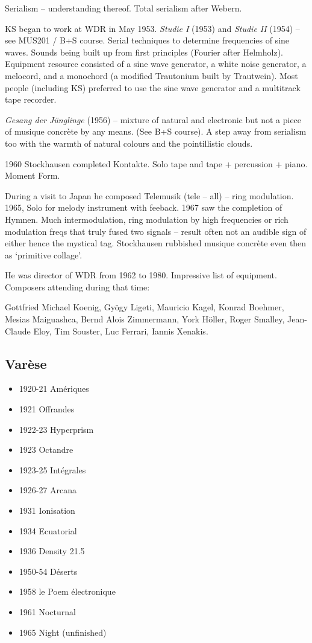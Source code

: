 Serialism – understanding thereof.  Total serialism after Webern. 

KS began to work at WDR in May 1953.  \textit{Studie I} (1953) and \textit{Studie II} (1954) – see MUS201 / B+S course. Serial techniques to determine frequencies of sine waves.  Sounds being built up from first principles (Fourier after Helmholz).  Equipment resource consisted of a sine wave generator, a white noise generator, a melocord, and a monochord (a modified Trautonium built by Trautwein).  Most people (including KS) preferred to use the sine wave generator and a multitrack tape recorder.

\textit{Gesang der J\"unglinge} (1956) – mixture of natural and electronic but not a piece of musique concr\`ete by any means. (See B+S course).  A step away from serialism too with the warmth of natural colours and the pointillistic clouds.

1960 Stockhausen completed Kontakte.  Solo tape and tape + percussion + piano.  Moment Form.
 
During a visit to Japan he composed Telemusik (tele – all) – ring modulation.  1965, Solo for melody instrument with feeback.  1967 saw the completion of Hymnen.  Much intermodulation, ring modulation by high frequencies or rich modulation freqs that truly fused two signals – result often not an audible sign of either hence the mystical tag.  Stockhausen rubbished musique concr\`ete even then as `primitive collage'. 

He was director of WDR from 1962 to 1980.  Impressive list of equipment.  Composers attending during that time:

Gottfried Michael Koenig, Gyögy Ligeti, Mauricio Kagel, Konrad Boehmer, Mesias Maiguashca, Bernd Alois Zimmermann, York H\"oller, Roger Smalley, Jean-Claude Eloy, Tim Souster, Luc Ferrari, Iannis Xenakis.

\subsection{Var\`ese}
\begin{itemize}
\item 1920-21		Am\'eriques
\item 1921		Offrandes
\item 1922-23		Hyperprism
\item 1923		Octandre
\item 1923-25		Int\'egrales
\item 1926-27		Arcana
\item 1931		Ionisation
\item 1934		Ecuatorial
\item 1936		Density 21.5
\item 1950-54		D\'eserts
\item 1958		le Poem \'electronique
\item 1961		Nocturnal
\item 1965		Night (unfinished)
\end{itemize}

